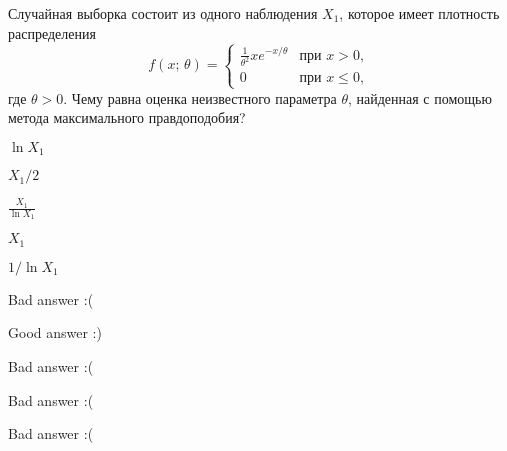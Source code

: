 
\begin{question}
Случайная выборка состоит из одного наблюдения \(X_1\), которое имеет
плотность распределения \[
f(x; \, \theta) = \begin{cases}
    \tfrac{1}{\theta^2} x e^{-x/\theta} & \text{при } x > 0,  \\
    0 & \text{при }x\leq 0,
  \end{cases}
\] где \(\theta > 0\). Чему равна оценка неизвестного параметра
\(\theta\), найденная с помощью метода максимального правдоподобия?
\begin{answerlist}
  \item \(\ln X_1\)
  \item \(X_1 / 2\)
  \item \(\frac{X_1}{\ln X_1}\)
  \item \(X_1\)
  \item \(1 / \ln X_1\)
\end{answerlist}
\end{question}

\begin{solution}
\begin{answerlist}
  \item Bad answer :(
  \item Good answer :)
  \item Bad answer :(
  \item Bad answer :(
  \item Bad answer :(
\end{answerlist}
\end{solution}

